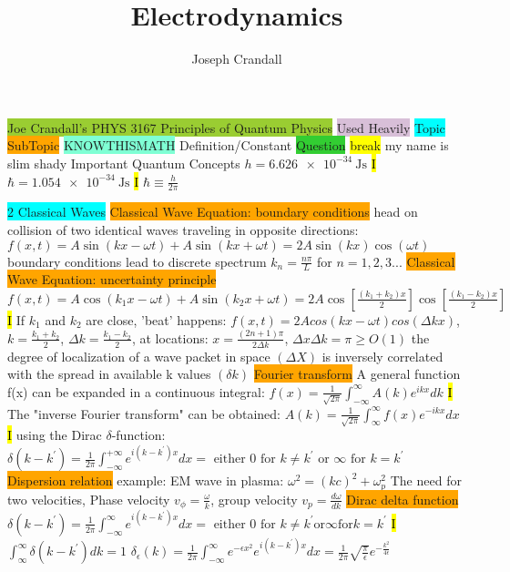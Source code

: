\documentclass[fontsize=4pt]{scrartcl}
\title{Electrodynamics}
\author{Joseph Crandall}
\begin{document}
\colorbox{YellowGreen}{Joe Crandall's PHYS 3167 Principles of Quantum Physics}
\colorbox{Thistle}{Used Heavily}
\colorbox{Cyan}{Topic}
\colorbox{Orange}{SubTopic}
\colorbox{Aquamarine}{KNOWTHISMATH}
\colorbox{RubineRed}{Definition/Constant}
\colorbox{LimeGreen}{Question}
\colorbox{Yellow}{break}
my name is slim shady
\colorbox{RubineRed}{Important Quantum Concepts}
$h = \SI{6.626e-34}{\joule \second} $
\hl{I}
$\hbar = \SI{1.054e-34}{\joule \second} $
\hl{I}
$\hbar \equiv \frac{h}{2\pi}$

\colorbox{Cyan}{2 Classical Waves}
\colorbox{Orange}{Classical Wave Equation: boundary conditions}
head on collision of two identical waves traveling in opposite directions:
$f(x,t) = A\sin(kx - \omega t) + A\sin (kx + \omega t) = 2 A\sin (kx) \cos( \omega t)$
boundary conditions lead to discrete spectrum
$k_n = \frac{n\pi}{L}$ for $n = 1,2,3 ...$
\colorbox{Orange}{Classical Wave Equation: uncertainty principle}
$f(x,t) = A\cos(k_1x - \omega t) + A\sin (k_2x + \omega t) = 2 A\cos [\frac{(k_1 + k_2)x}{2}] \cos[ \frac{(k_1 - k_2)x}{2}]$
\hl{I}
If $k_1$ and $k_2$ are close, 'beat' happens: $f(x,t) = 2Acos(kx - \omega t)cos(\Delta k x)$, $k=\frac{k_1+k_2}{2}$, $\Delta k = \frac{k_1 - k_2}{2}$, at locations: $x = \frac{(2n+1)\pi}{2\Delta k}$, $\Delta x\Delta k = \pi \geq O(1)$ the degree of localization of a wave packet in space $(\Delta X)$ is inversely correlated with the spread in available k values $(\delta k)$
\colorbox{Orange}{Fourier transform}
A general function f(x) can be expanded in a continuous integral:
$f(x)=\frac{1}{\sqrt{2\pi}}\int_{-\infty}^{\infty}A(k)e^{ikx}dk$
\hl{I}
The "inverse Fourier transform" can be obtained:
$A(k) = \frac{1}{\sqrt{2\pi}}\int_{\infty}^{\infty}f(x)e^{-ikx}dx$
\hl{I}
using the Dirac $\delta$-function:
$\delta(k-k^{\prime})=\frac{1}{2\pi}\int_{-\infty}^{+\infty}e^{i(k-k^{\prime})x}dx = \text{ either } 0 \text{ for } k \neq k^{\prime} \text{ or } \infty \text { for } k=k^{\prime}$ 
\colorbox{Orange}{Dispersion relation}
example: EM wave in plasma: $\omega^2 = (kc)^2 + \omega_p^2$ The need for two velocities, Phase velocity $v_{\phi} = \frac{\omega}{k}$, group velocity $v_p = \frac{d \omega}{d k}$
\colorbox{Orange}{Dirac delta function}
$\delta(k-k^{\prime}) = \frac{1}{2\pi}\int_{-\infty}^{\infty} e^{i(k-k^{\prime})x}dx = \text{ either } 0 \text{ for } k\neq k^{\prime} \text{or} \infty \text{for} k=k^{\prime}$ 
\hl{I}
$\int_{\infty}^{\infty} \delta (k-k^{\prime})dk = 1$
$\delta_{\epsilon}(k) = \frac{1}{2\pi}\int_{-\infty}^{\infty}e^{-\epsilon x^2}e^{i(k-k^{\prime})x}dx = \frac{1}{2\pi}\sqrt{\frac{\pi}{\epsilon}}e^{-\frac{k^2}{4\epsilon}}$
\end{document}
